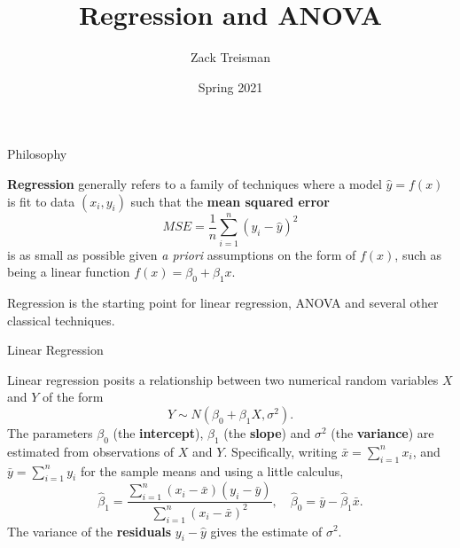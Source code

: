 \documentclass[
  ignorenonframetext,
]{beamer}
\title{Regression and ANOVA}
\author{Zack Treisman}
\date{Spring 2021}
\begin{document}
\frame{\titlepage}

\begin{frame}{Philosophy}
\protect\hypertarget{philosophy}{}

\textbf{Regression} generally refers to a family of techniques where a
model \(\hat{y}=f(x)\) is fit to data \((x_i, y_i)\) such that the
\textbf{mean squared error} \[
MSE=\frac{1}{n}\sum_{i=1}^n(y_i-\hat{y})^2
\] is as small as possible given \emph{a priori} assumptions on the form
of \(f(x)\), such as being a linear function \(f(x)=\beta_0+\beta_1 x\).

Regression is the starting point for linear regression, ANOVA and
several other classical techniques.

\end{frame}

\begin{frame}{Linear Regression}
\protect\hypertarget{linear-regression}{}

Linear regression posits a relationship between two numerical random
variables \(X\) and \(Y\) of the form \[
Y \sim N(\beta_0+\beta_1 X, \sigma^2).
\] The parameters \(\beta_0\) (the \textbf{intercept}), \(\beta_1\) (the
\textbf{slope}) and \(\sigma^2\) (the \textbf{variance}) are estimated
from observations of \(X\) and \(Y\). Specifically, writing
\(\bar x = \sum^n_{i=1}x_i\), and \(\bar y = \sum^n_{i=1}y_i\) for the
sample means and using a little calculus, \[
\hat \beta_1 = \frac{\sum^n_{i=1}(x_i-\bar x)(y_i-\bar y)}{\sum^n_{i=1}(x_i-\bar x)^2}, \quad
\hat \beta_0 = \bar y - \hat\beta_1\bar x.
\] The variance of the \textbf{residuals} \(y_i-\hat{y}\) gives the
estimate of \(\sigma^2\).

\end{frame}
\end{document}
